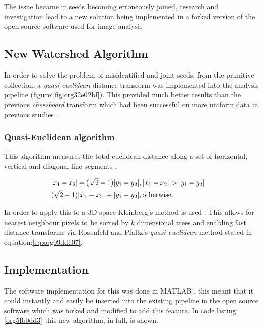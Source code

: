 \documentclass[11pt]{report}
\begin{document}
The issue became in seeds becoming erroneously joined, research and investigation lead to a new solution being implemented in a forked version of the open source software used for image analysis \cite{Hughes2017}

\subsection{New Watershed Algorithm}
\label{sec:org3bdf844}

In order to solve the problem of misidentified and joint seeds, from the primitive collection,
a  \emph{quasi-euclidean} distance transform was implemented into the analysis pipeline (figure:\ref{fig:org32e02bf}). This provided much better results than the previous
\emph{chessboard} transform which had been successful on more uniform data in previous studies \cite{Hughes2017}.

\subsubsection{Quasi-Euclidean algorithm}
\label{sec:orga06fdaf}

This algorithm measures the total euclidean distance along a set of horizontal, vertical and diagonal
line segments \cite{Pfaltz1966}.

\begin{align}
\label{eq:org09dd107}
  &\begin{aligned}
&|x_1-x_2|+(\sqrt{2}-1)|y_1-y_2|, |x_1-x_2| > |y_1-y_2| \\
      &(\sqrt{2}-1)|x_1-x_2| + |y_1-y_2|, \textup{otherwise.}
  \end{aligned}
\end{align}

In order to apply this to a 3D space Kleinberg's method is used  \cite{Kleinberg1997}. This allows for nearest neighbour pixels to be sorted by \(k\) dimensional trees
and enabling fast distance transforms via Rosenfeld and Pfaltz's \emph{quasi-euclidean} method stated in equation:\ref{eq:org09dd107}.

\subsection{Implementation}
\label{sec:orgb36e6ca}

The software implementation for this was done in MATLAB \cite{MATHWORKS2017}, this meant that it could instantly and easily be inserted into the existing pipeline in the open source software which was forked and modified to add this feature. In code listing:\ref{org5fb0dd3} this new algorithm, in full, is shown.
\end{document}
